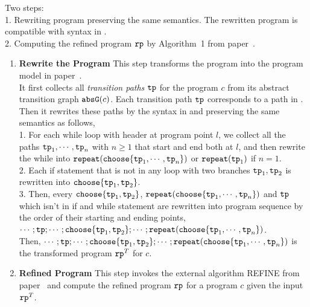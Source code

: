 Two steps:
\\
1. Rewriting program preserving the same semantics. The rewritten program is compatible with syntax in \cite{GulwaniJK09}.
\\
2. Computing the 
refined program $\mathtt{rp}$ by Algorithm~1 from paper~\cite{GulwaniJK09}.

\begin{enumerate}
\item \textbf{Rewrite the Program}
This step transforms the program into the program model in paper~\cite{GulwaniJK09}. 
\\
It first collects all \emph{transition paths} $\mathtt{tp}$ for the program $c$ from its abstract transition graph $\mathtt{abs}{\mathtt{G}}(c)$.
%
Each transition path $\mathtt{tp}$ corresponds to a path in \cite{GulwaniJK09}.
%
\\
Then it rewrites these paths by the syntax in \cite{GulwaniJK09} and preserving the same semantics as follows,
\\
1. For each while loop with header at program point $l$, we
collect all the paths $\mathtt{tp}_1, \cdots , \mathtt{tp}_n$ with $n \geq 1$ that start and end both at $l$, 
and then rewrite the while into  $\rprepeat(\rpchoose{\tpath_1, \cdots, \tpath_n})$ or $\mathtt{repeat}(\mathtt{tp}_1)$ if $n = 1$.
\\
2. Each if statement that is not in any loop with two branches $\mathtt{tp}_1, \mathtt{tp}_2$
is rewritten into $\rpchoose{\tpath_1, \tpath_2 }$.
\\
3. Then, every $\rpchoose{\tpath_1, \tpath_2 }$,  $\rprepeat(\rpchoose{\tpath_1, \cdots, \tpath_n})$ 
and $\mathtt{tp}$ which isn't in if and while statement 
are rewritten into program sequence  by the order of their starting and ending points,
$\cdots; \tpath;\cdots;  \rpchoose{\tpath_1, \tpath_2 }; \cdots; \rprepeat(\rpchoose{\tpath_1, \cdots, \tpath_n})$.
\\
Then, $\cdots; \tpath;\cdots;  \rpchoose{\tpath_1, \tpath_2 }; \cdots; \rprepeat(\rpchoose{\tpath_1, \cdots, \tpath_n})$
is the transformed program $\mathtt{rp}^{T}$ for $c$.
%
\item \textbf{Refined Program}
This step invokes the external algorithm REFINE from paper~\cite{GulwaniJK09} and compute the 
refined program $\mathtt{rp}$ for a program $c$ given the input $\mathtt{rp}^{T}$.
\end{enumerate}